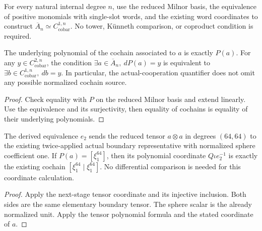 \begin{definition}
  \label{def:h6-reduced-cooperation-cochains}
  \leanok
  For every natural internal degree $n$, use the reduced Milnor basis,
  the equivalence of positive monomials with single-slot words, and the
  existing word coordinates to construct
  $\overline A_n\simeq C^{1,n}_{\mathrm{cobar}}$.
  No tower, K\"unneth comparison, or coproduct condition is required.
\end{definition}

\begin{proposition}
  \label{prop:h6-reduced-cooperation-cochains}
  \leanok
  The underlying polynomial of the cochain associated to $a$ is exactly
  $P(a)$. For any $y\in C^{2,n}_{\mathrm{cobar}}$, the condition
  $\exists a\in\overline A_n,\ dP(a)=y$ is equivalent to
  $\exists b\in C^{1,n}_{\mathrm{cobar}},\ db=y$.
  In particular, the actual-cooperation quantifier does not omit any
  possible normalized cochain source.
\end{proposition}
\begin{proof}
  Check equality with $P$ on the reduced Milnor basis and extend linearly.
  Use the equivalence and its surjectivity, then equality of cochains is
  equality of their underlying polynomials.
  \leanok
\end{proof}

\begin{proposition}
  \label{prop:h6-square-double-reduced-coordinate}
  \leanok
  The derived equivalence $e_2$ sends the reduced tensor $a\otimes a$
  in degrees $(64,64)$ to the existing twice-applied actual boundary
  representative with normalized sphere coefficient one. If
  $P(a)=[\xi_1^{64}]$, then its polynomial coordinate
  $Q\iota e_2^{-1}$ is exactly the existing cochain
  $[\xi_1^{64}\mid\xi_1^{64}]$.
  No differential comparison is needed for this coordinate calculation.
\end{proposition}
\begin{proof}
  Apply the next-stage tensor coordinate and its injective inclusion.
  Both sides are the same elementary boundary tensor. The sphere scalar
  is the already normalized unit. Apply the tensor polynomial formula
  and the stated coordinate of $a$.
  \leanok
\end{proof}

